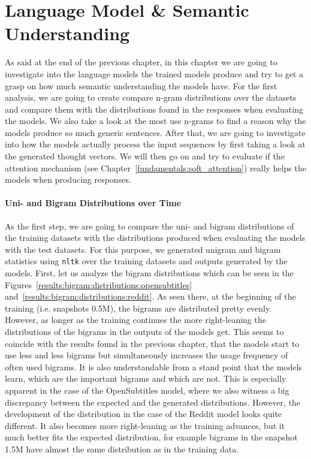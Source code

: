 \section{Language Model \& Semantic Understanding}
As said at the end of the previous chapter, in this chapter we are going to investigate into the language models the trained models produce and try to get a grasp on how much semantic understanding the models have. For the first analysis, we are going to create compare n-gram distributions over the datasets and compare them with the distributions found in the responses when evaluating the models. We also take a look at the most use n-grams to find a reason why the models produce so much generic sentences. After that, we are going to investigate into how the models actually process the input sequences by first taking a look at the generated thought vectors. We will then go on and try to evaluate if the attention mechanism (see Chapter~\ref{fundamentals:soft_attention}) really helps the models when producing responses.

\paragraph{Uni- and Bigram Distributions over Time}
As the first step, we are going to compare the uni- and bigram distributions of the training datasets with the distributions produced when evaluating the models with the test datasets. For this purpose, we generated unigram and bigram statistics using \texttt{nltk} over the training datasets and outputs generated by the models. First, let us analyze the bigram distributions which can be seen in the Figures~\ref{results:bigram:distributions:opensubtitles} and~\ref{results:bigram:distributions:reddit}. As seen there, at the beginning of the training (i.e. snapshots 0.5M), the bigrams are distributed pretty evenly. However, as longer as the training continues the more right-leaning the distributions of the bigrams in the outputs of the models get. This seems to coincide with the results found in the previous chapter, that the models start to use less and less bigrams but simultaneously increases the usage frequency of often used bigrams. It is also understandable from a stand point that the models learn, which are the important bigrams and which are not. This is especially apparent in the case of the OpenSubtitles model, where we also witness a big discrepancy between the expected and the generated distributions. However, the development of the distribution in the case of the Reddit model looks quite different. It also becomes more right-leaning as the training advances, but it much better fits the expected distribution, for example bigrams in the snapshot 1.5M have almost the same distribution as in the training data.

